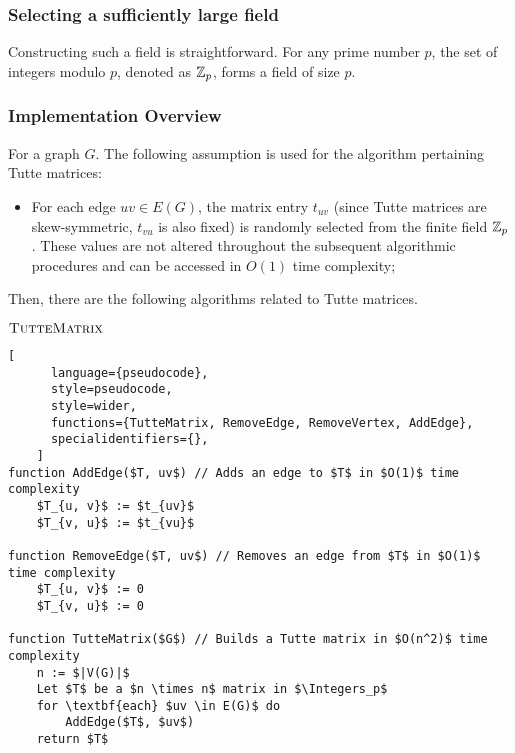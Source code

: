 \subsubsection{Selecting a sufficiently large field}
Constructing such a field is straightforward. 
For any prime number \(p\), the set of integers modulo \(p\), denoted as \(\mathbb{Z}_{p}\), forms a field of size \(p\).

\subsubsection{Implementation Overview}

For a graph \(G\). The following assumption is used for the algorithm pertaining Tutte matrices:
\begin{itemize}
    \item For each edge \(uv \in E(G)\), the matrix entry \(t_{uv}\) (since Tutte matrices are skew-symmetric, \(t_{vu}\) is also fixed) is randomly selected from the finite field \(\mathbb{Z}_p\). 
    These values are not altered throughout the subsequent algorithmic procedures and can be accessed in $O(1)$ time complexity;
\end{itemize}
Then, there are the following algorithms related to Tutte matrices.

\begin{programruledcaption}{\(\textsc{TutteMatrix}\)}
    \label{alg:tuttematrix}
    \begin{lstlisting}[
      language={pseudocode},
      style=pseudocode,
      style=wider,
      functions={TutteMatrix, RemoveEdge, RemoveVertex, AddEdge},
      specialidentifiers={},
    ]
function AddEdge($T, uv$) // Adds an edge to $T$ in $O(1)$ time complexity
    $T_{u, v}$ := $t_{uv}$
    $T_{v, u}$ := $t_{vu}$

function RemoveEdge($T, uv$) // Removes an edge from $T$ in $O(1)$ time complexity
    $T_{u, v}$ := 0
    $T_{v, u}$ := 0

function TutteMatrix($G$) // Builds a Tutte matrix in $O(n^2)$ time complexity
    n := $|V(G)|$
    Let $T$ be a $n \times n$ matrix in $\Integers_p$
    for \textbf{each} $uv \in E(G)$ do
        AddEdge($T$, $uv$)
    return $T$
    \end{lstlisting}
\end{programruledcaption}

